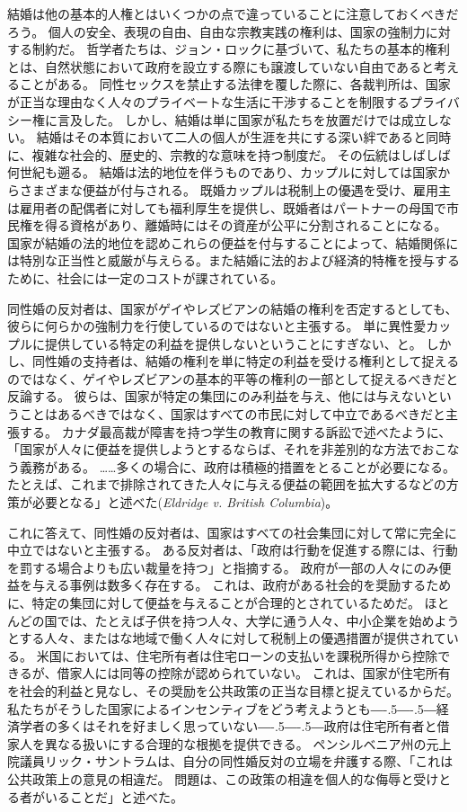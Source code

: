 \documentclass[paper=a4,book,openany]{jlreq}
\def\DDASH{―\kern-.5\zw―\kern-.5\zw―} %
\begin{document}
結婚は他の基本的人権とはいくつかの点で違っていることに注意しておくべきだろう。
個人の安全、表現の自由、自由な宗教実践の権利は、国家の強制力に対する制約だ。
哲学者たちは、ジョン・ロックに基づいて、私たちの基本的権利とは、自然状態において政府を設立する際にも譲渡していない自由であると考えることがある。
同性セックスを禁止する法律を覆した際に、各裁判所は、国家が正当な理由なく人々のプライベートな生活に干渉することを制限するプライバシー権に言及した。
しかし、結婚は単に国家が私たちを放置だけでは成立しない。
結婚はその本質において二人の個人が生涯を共にする深い絆であると同時に、複雑な社会的、歴史的、宗教的な意味を持つ制度だ。
その伝統はしばしば何世紀も遡る。
結婚は法的地位を伴うものであり、カップルに対しては国家からさまざまな便益が付与される。
既婚カップルは税制上の優遇を受け、雇用主は雇用者の配偶者に対しても福利厚生を提供し、既婚者はパートナーの母国で市民権を得る資格があり、離婚時にはその資産が公平に分割されることになる。
国家が結婚の法的地位を認めこれらの便益を付与することによって、結婚関係には特別な正当性と威厳が与えらる。また結婚に法的および経済的特権を授与するために、社会には一定のコストが課されている。

同性婚の反対者は、国家がゲイやレズビアンの結婚の権利を否定するとしても、彼らに何らかの強制力を行使しているのではないと主張する。
単に異性愛カップルに提供している特定の利益を提供しないということにすぎない、と。
しかし、同性婚の支持者は、結婚の権利を単に特定の利益を受ける権利として捉えるのではなく、ゲイやレズビアンの基本的平等の権利の一部として捉えるべきだと反論する。
彼らは、国家が特定の集団にのみ利益を与え、他には与えないということはあるべきではなく、国家はすべての市民に対して中立であるべきだと主張する。
カナダ最高裁が障害を持つ学生の教育に関する訴訟で述べたように、「国家が人々に便益を提供しようとするならば、それを非差別的な方法でおこなう義務がある。
……多くの場合に、政府は積極的措置をとることが必要になる。
たとえば、これまで排除されてきた人々に与える便益の範囲を拡大するなどの方策が必要となる」と述べた(\emph{Eldridge v. British Columbia})。

これに答えて、同性婚の反対者は、国家はすべての社会集団に対して常に完全に中立ではないと主張する。
ある反対者は、「政府は行動を促進する際には、行動を罰する場合よりも広い裁量を持つ」と指摘する\citep[p.607]{dent99:_defen_tradit_marriag}。
政府が一部の人々にのみ便益を与える事例は数多く存在する。
これは、政府がある社会的を奨励するために、特定の集団に対して便益を与えることが合理的とされているためだ。
ほとんどの国では、たとえば子供を持つ人々、大学に通う人々、中小企業を始めようとする人々、またはな地域で働く人々に対して税制上の優遇措置が提供されている。
米国においては、住宅所有者は住宅ローンの支払いを課税所得から控除できるが、借家人には同等の控除が認められていない。
これは、国家が住宅所有を社会的利益と見なし、その奨励を公共政策の正当な目標と捉えているからだ。
私たちがそうした国家によるインセンティブをどう考えようとも{\DDASH}経済学者の多くはそれを好ましく思っていない{\DDASH}政府は住宅所有者と借家人を異なる扱いにする合理的な根拠を提供できる。
ペンシルベニア州の元上院議員リック・サントラムは、自分の同性婚反対の立場を弁護する際、「これは公共政策上の意見の相違だ。
問題は、この政策の相違を個人的な侮辱と受けとる者がいることだ」と述べた\citep{villalva12:_gay_activ_rebuk_bully_santor}。
\end{document}
